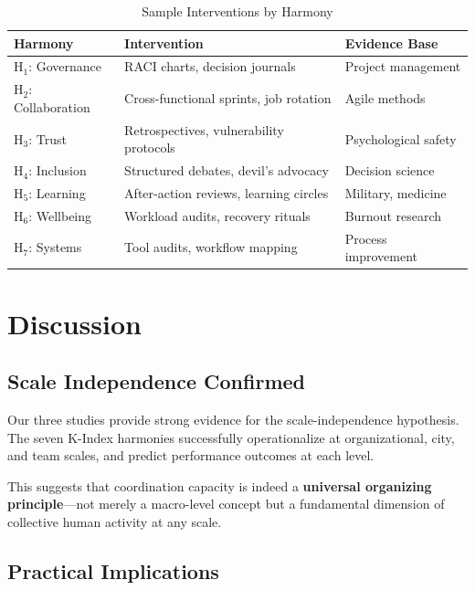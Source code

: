 \documentclass[12pt,a4paper]{article}
\begin{document}
\begin{table}[H]
\centering
\caption{Sample Interventions by Harmony}
\label{tab:interventions}
\small
\begin{tabular}{p{2.5cm}p{5cm}p{3cm}}
\toprule
\textbf{Harmony} & \textbf{Intervention} & \textbf{Evidence Base} \\
\midrule
H$_1$: Governance & RACI charts, decision journals & Project management \\
H$_2$: Collaboration & Cross-functional sprints, job rotation & Agile methods \\
H$_3$: Trust & Retrospectives, vulnerability protocols & Psychological safety \\
H$_4$: Inclusion & Structured debates, devil's advocacy & Decision science \\
H$_5$: Learning & After-action reviews, learning circles & Military, medicine \\
H$_6$: Wellbeing & Workload audits, recovery rituals & Burnout research \\
H$_7$: Systems & Tool audits, workflow mapping & Process improvement \\
\bottomrule
\end{tabular}
\end{table}

\section{Discussion}
\label{sec:discussion}

\subsection{Scale Independence Confirmed}

Our three studies provide strong evidence for the scale-independence hypothesis. The seven K-Index harmonies successfully operationalize at organizational, city, and team scales, and predict performance outcomes at each level.

This suggests that coordination capacity is indeed a \textbf{universal organizing principle}---not merely a macro-level concept but a fundamental dimension of collective human activity at any scale.

\subsection{Practical Implications}
\end{document}
